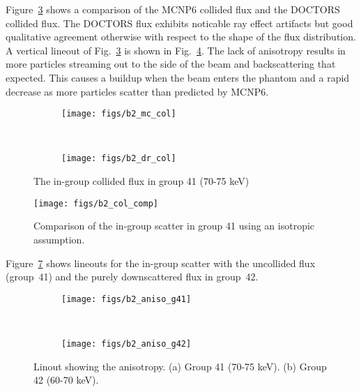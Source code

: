 Figure~\ref{fig:b2_col} shows a comparison of the MCNP6 collided flux and the DOCTORS collided flux. The DOCTORS flux exhibits noticable ray effect artifacts but good qualitative agreement otherwise with respect to the shape of the flux distribution. A vertical lineout of Fig.~\ref{fig:b2_col} is shown in Fig.~\ref{fig:b2_col_comp}. The lack of anisotropy results in more particles streaming out to the side of the beam and backscattering that expected. This causes a buildup when the beam enters the phantom and a rapid decrease as more particles scatter than predicted by MCNP6.

\begin{figure}
    \centering
    \begin{subfigure}[b]{0.45\textwidth}
        \texttt{[image: figs/b2\_mc\_col]}
        \caption{}
        \label{fig:b2_mc_col}
    \end{subfigure}
    ~
    \begin{subfigure}[b]{0.45\textwidth}
        \texttt{[image: figs/b2\_dr\_col]}
        \caption{}
        \label{fig:b2_dr_col}
    \end{subfigure}
    \caption{The in-group collided flux in group 41 (70-75 keV)}\label{fig:b2_col}
\end{figure}

\begin{figure}[tb]
  \begin{center}
   \texttt{[image: figs/b2\_col\_comp]}
  \end{center}
  \caption{Comparison of the in-group scatter in group 41 using an isotropic assumption.}
\label{fig:b2_col_comp}
\end{figure}

Figure~\ref{fig:b2_aniso} shows lineouts for the in-group scatter with the uncollided flux (group~41) and the purely downscattered flux in group~42.
\begin{figure}
    \centering
    \begin{subfigure}[b]{0.3\textwidth}
        \texttt{[image: figs/b2\_aniso\_g41]}
        \caption{}
        \label{fig:b2_aniso_g41}
    \end{subfigure}
    ~ 
    \begin{subfigure}[b]{0.3\textwidth}
        \texttt{[image: figs/b2\_aniso\_g42]}
        \caption{}
        \label{fig:b2_aniso_g42}
    \end{subfigure}
    \caption{Linout showing the anisotropy. (a) Group 41 (70-75 keV). (b) Group 42 (60-70 keV). }\label{fig:b2_aniso}
\end{figure}

